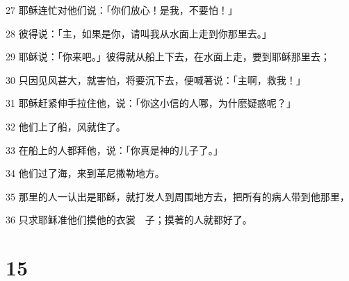 \par 27 耶稣连忙对他们说：「你们放心！是我，不要怕！」
\par 28 彼得说：「主，如果是你，请叫我从水面上走到你那里去。」
\par 29 耶稣说：「你来吧。」彼得就从船上下去，在水面上走，要到耶稣那里去；
\par 30 只因见风甚大，就害怕，将要沉下去，便喊著说：「主啊，救我！」
\par 31 耶稣赶紧伸手拉住他，说：「你这小信的人哪，为什麽疑惑呢？」
\par 32 他们上了船，风就住了。
\par 33 在船上的人都拜他，说：「你真是神的儿子了。」
\par 34 他们过了海，来到革尼撒勒地方。
\par 35 那里的人一认出是耶稣，就打发人到周围地方去，把所有的病人带到他那里，
\par 36 只求耶稣准他们摸他的衣裳　子；摸著的人就都好了。

\chapter{15}

